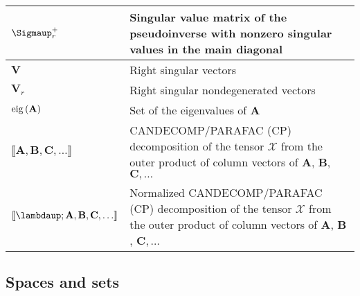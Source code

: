 \begin{xltabular}{\textwidth}{XX}
	\(\boldsymbol{\Sigmaup}^{+}_r\)                                                             & Singular value matrix of the pseudoinverse with nonzero singular values in the main diagonal                                                                                         \\ \hline
	\(\mathbf{V}\)                                                                              & Right singular vectors \cite{strangIntroductionLinearAlgebra1993}                                                                                                                    \\ \hline
	\(\mathbf{V}_r\)                                                                            & Right singular nondegenerated vectors                                                                                                                                                \\ \hline
	\(\operatorname{eig}\left(\mathbf{A}\right)\)                                                                        & Set of the eigenvalues of \(\mathbf{A}\) \cite{chellappaSignalProcessingTheory2014,leon-garciaProbabilityStatisticsRandom2007,petersenMatrixCookbook2008}                            \\ \hline
	\(\llbracket \mathbf{A}, \mathbf{B}, \mathbf{C}, \dots \rrbracket\)                         & CANDECOMP/PARAFAC (CP) decomposition of the tensor \(\bm{\mathcal{X}}\) from the outer product of column vectors of \(\mathbf{A}\), \(\mathbf{B}\), \(\mathbf{C}, \dots\)            \\ \hline
	\(\llbracket \boldsymbol{\lambdaup}; \mathbf{A}, \mathbf{B}, \mathbf{C}, \dots \rrbracket\) & Normalized CANDECOMP/PARAFAC (CP) decomposition of the tensor \(\bm{\mathcal{X}}\) from the outer product of column vectors of \(\mathbf{A}\), \(\mathbf{B}\), \(\mathbf{C}, \dots\) \\
\end{xltabular}
\subsection{Spaces and sets}
